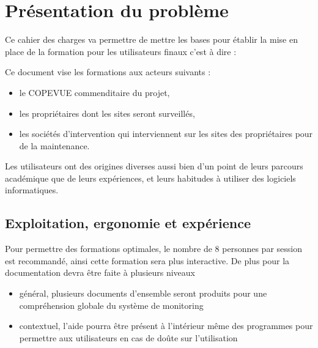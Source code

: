 \section{Présentation du problème}

Ce cahier des charges va permettre de mettre les bases pour établir la mise 
en place de la formation pour les utilisateurs finaux c'est à dire : 

Ce document vise les formations aux acteurs suivants : 
\begin{itemize}
	\item le COPEVUE commenditaire du projet,
	\item les propriétaires dont les sites seront surveillés,
	\item les sociétés d'intervention qui interviennent sur les sites des 
	propriétaires pour de la maintenance.
\end{itemize}

Les utilisateurs ont des origines diverses aussi bien d'un point de leurs parcours
 académique que de leurs expériences, et leurs habitudes à utiliser des logiciels
informatiques.




\subsection{Exploitation, ergonomie et expérience}

Pour permettre des formations optimales, le nombre de 8 personnes par session est
recommandé, ainsi cette formation sera plus interactive. 
De plus pour la documentation devra être faite à plusieurs niveaux 
\begin{itemize}
	\item général, plusieurs documents d'ensemble seront produits pour une compréhension
	globale du système de monitoring
	\item contextuel, l'aide pourra être présent à l'intérieur même des programmes pour
	permettre aux utilisateurs en cas de doûte sur l'utilisation
\end{itemize}


